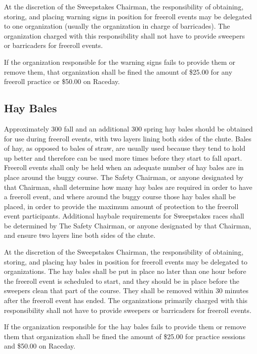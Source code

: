 	At the discretion of the Sweepstakes Chairman, the responsibility of obtaining,
	storing, and placing warning signs in position for freeroll events may be
	delegated to one organization (usually the organization in charge of
	barricades). The organization charged with this responsibility shall not have
	to provide sweepers or barricaders for freeroll events.

	If the organization responsible for the warning signs fails to provide them or
	remove them, that organization shall be fined the amount of \$25.00 for any 
	freeroll practice or \$50.00 on Raceday.
	
	
\subsection{Hay Bales}
\label{subsec:Haybales}

	Approximately 300 fall and an additional 300 spring hay bales should be 
	obtained for use during freeroll events, with two layers lining both sides 
	of the chute. Bales of hay, as opposed to bales of straw, are usually used 
	because they tend to hold up better and therefore can be used more times before 
	they start to fall apart. Freeroll events shall only be held when an adequate 
	number of hay bales are in place around the buggy course. The Safety Chairman, 
	or anyone designated by that Chairman, shall determine how many hay bales are 
	required in order to have a freeroll event, and where around the buggy course 
	those hay bales shall be placed, in order to provide the maximum amount of 
	protection to the freeroll event participants. Additional haybale requirements 
	for Sweepstakes races shall be determined by The Safety Chairman, or anyone 
	designated by that Chairman, and ensure two layers line both sides of the chute.

	At the discretion of the Sweepstakes Chairman, the responsibility of obtaining,
	storing, and placing hay bales in position for freeroll events may be
	delegated to organizations. The hay bales shall be put in place no later
	than one hour before the freeroll event is scheduled to start, and they
	should be in place before the sweepers clean that part of the course. They
	shall be removed within 30 minutes after the freeroll event has ended. The
	organizations primarily charged with this responsibility shall not have to 
	provide sweepers or barricaders for freeroll events.

	If the organization responsible for the hay bales fails to provide them or
	remove them that organization shall be fined the amount of \$25.00 for 
	practice sessions and \$50.00 on Raceday.
	
